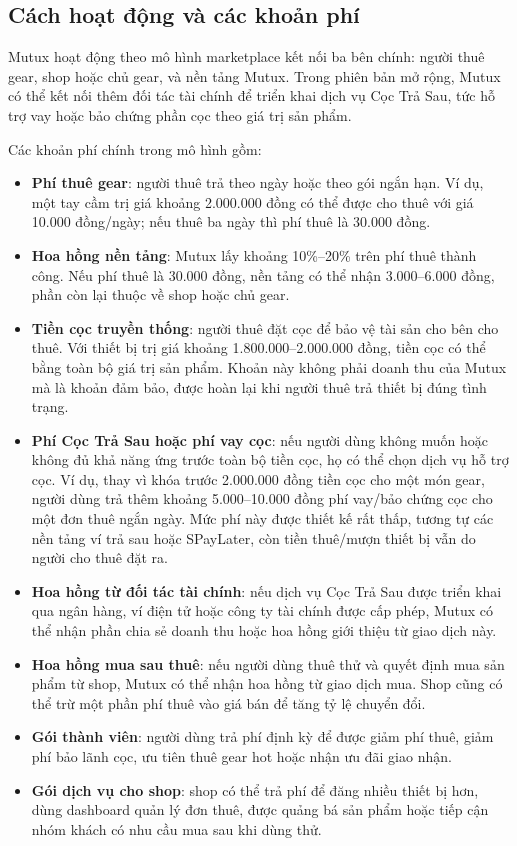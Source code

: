 \subsection{Cách hoạt động và các khoản phí}

Mutux hoạt động theo mô hình marketplace kết nối ba bên chính: người thuê gear, shop hoặc chủ gear, và nền tảng Mutux. Trong phiên bản mở rộng, Mutux có thể kết nối thêm đối tác tài chính để triển khai dịch vụ Cọc Trả Sau, tức hỗ trợ vay hoặc bảo chứng phần cọc theo giá trị sản phẩm.

Các khoản phí chính trong mô hình gồm:

\begin{itemize}
    \item \textbf{Phí thuê gear}: người thuê trả theo ngày hoặc theo gói ngắn hạn. Ví dụ, một tay cầm trị giá khoảng 2.000.000 đồng có thể được cho thuê với giá 10.000 đồng/ngày; nếu thuê ba ngày thì phí thuê là 30.000 đồng.
    \item \textbf{Hoa hồng nền tảng}: Mutux lấy khoảng 10\%--20\% trên phí thuê thành công. Nếu phí thuê là 30.000 đồng, nền tảng có thể nhận 3.000--6.000 đồng, phần còn lại thuộc về shop hoặc chủ gear.
    \item \textbf{Tiền cọc truyền thống}: người thuê đặt cọc để bảo vệ tài sản cho bên cho thuê. Với thiết bị trị giá khoảng 1.800.000--2.000.000 đồng, tiền cọc có thể bằng toàn bộ giá trị sản phẩm. Khoản này không phải doanh thu của Mutux mà là khoản đảm bảo, được hoàn lại khi người thuê trả thiết bị đúng tình trạng.
    \item \textbf{Phí Cọc Trả Sau hoặc phí vay cọc}: nếu người dùng không muốn hoặc không đủ khả năng ứng trước toàn bộ tiền cọc, họ có thể chọn dịch vụ hỗ trợ cọc. Ví dụ, thay vì khóa trước 2.000.000 đồng tiền cọc cho một món gear, người dùng trả thêm khoảng 5.000--10.000 đồng phí vay/bảo chứng cọc cho một đơn thuê ngắn ngày. Mức phí này được thiết kế rất thấp, tương tự các nền tảng ví trả sau hoặc SPayLater, còn tiền thuê/mượn thiết bị vẫn do người cho thuê đặt ra.
    \item \textbf{Hoa hồng từ đối tác tài chính}: nếu dịch vụ Cọc Trả Sau được triển khai qua ngân hàng, ví điện tử hoặc công ty tài chính được cấp phép, Mutux có thể nhận phần chia sẻ doanh thu hoặc hoa hồng giới thiệu từ giao dịch này.
    \item \textbf{Hoa hồng mua sau thuê}: nếu người dùng thuê thử và quyết định mua sản phẩm từ shop, Mutux có thể nhận hoa hồng từ giao dịch mua. Shop cũng có thể trừ một phần phí thuê vào giá bán để tăng tỷ lệ chuyển đổi.
    \item \textbf{Gói thành viên}: người dùng trả phí định kỳ để được giảm phí thuê, giảm phí bảo lãnh cọc, ưu tiên thuê gear hot hoặc nhận ưu đãi giao nhận.
    \item \textbf{Gói dịch vụ cho shop}: shop có thể trả phí để đăng nhiều thiết bị hơn, dùng dashboard quản lý đơn thuê, được quảng bá sản phẩm hoặc tiếp cận nhóm khách có nhu cầu mua sau khi dùng thử.
\end{itemize}

